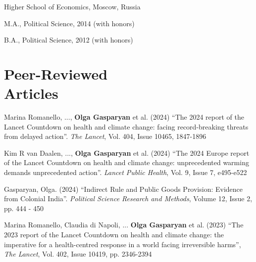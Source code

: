 \documentclass[margin,line,10.95pt]{res}
\newenvironment{list1}{
  \begin{list}{\ding{113}}{%
      \setlength{\itemsep}{0in}
      \setlength{\parsep}{0in} \setlength{\parskip}{0in}
      \setlength{\topsep}{0in} \setlength{\partopsep}{0in}
      \setlength{\leftmargin}{0.17in}}}{\end{list}}
\begin{document}
\begin{resume}
\vspace{-3mm}
{Higher School of Economics, Moscow, Russia}\\
\vspace*{-.1in}
\begin{list1}
 \item[] M.A., Political Science, 2014 (with honors) 
\item[] B.A., Political Science, 2012 (with honors)
\end{list1}



\section{\sc Peer-Reviewed \\ Articles}
Marina Romanello, ..., \textbf{Olga Gasparyan} et al.  (2024) ``The 2024 report of the Lancet Countdown on health and climate change: facing record-breaking threats from delayed action''. \textit{The Lancet}, Vol. 404, Issue 10465, 1847-1896


\vspace*{-2.5mm}

Kim R van Daalen, ..., \textbf{Olga Gasparyan} et al.  (2024) ``The 2024 Europe report of the Lancet Countdown on health and climate change: unprecedented warming demands unprecedented action''. \textit{Lancet Public Health}, Vol. 9, Issue 7, e495-e522


\vspace*{-2.5mm}


Gasparyan, Olga. (2024) ``Indirect Rule and Public Goods Provision: Evidence from Colonial India''. \textit{Political Science Research and Methods}, Volume 12, Issue 2, pp. 444 - 450


\vspace*{-2.5mm}

Marina Romanello, Claudia di Napoli, ... \textbf{Olga Gasparyan} et al. (2023) ``The 2023 report of the Lancet Countdown on health and climate change: the imperative for a health-centred response in a world facing irreversible harms'', \textit{The Lancet},  Vol. 402, Issue 10419, pp. 2346-2394  



\end{resume}
\end{document}
